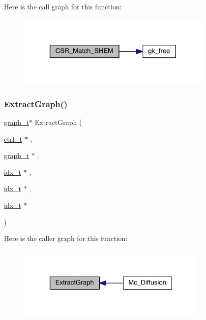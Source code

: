 Here is the call graph for this function\+:\nopagebreak
\begin{figure}[H]
\begin{center}
\leavevmode
\includegraphics[width=272pt]{a00951_a2a23c46e95ebf1689ff36360528696ac_cgraph}
\end{center}
\end{figure}
\mbox{\label{a00951_a5093697d7f54dcfc45968a3b28722ef2}} 
\subsubsection{\texorpdfstring{Extract\+Graph()}{ExtractGraph()}}
{\footnotesize\ttfamily \hyperlink{a00734}{graph\+\_\+t}$\ast$ Extract\+Graph (\begin{DoxyParamCaption}\item[{\hyperlink{a00742}{ctrl\+\_\+t} $\ast$}]{,  }\item[{\hyperlink{a00734}{graph\+\_\+t} $\ast$}]{,  }\item[{\hyperlink{a00876_aaa5262be3e700770163401acb0150f52}{idx\+\_\+t} $\ast$}]{,  }\item[{\hyperlink{a00876_aaa5262be3e700770163401acb0150f52}{idx\+\_\+t} $\ast$}]{,  }\item[{\hyperlink{a00876_aaa5262be3e700770163401acb0150f52}{idx\+\_\+t} $\ast$}]{ }\end{DoxyParamCaption})}

Here is the caller graph for this function\+:\nopagebreak
\begin{figure}[H]
\begin{center}
\leavevmode
\includegraphics[width=266pt]{a00951_a5093697d7f54dcfc45968a3b28722ef2_icgraph}
\end{center}
\end{figure}
\mbox{\label{a00951_ad0dfda007894503b9653ff3ae65ed54b}} 
